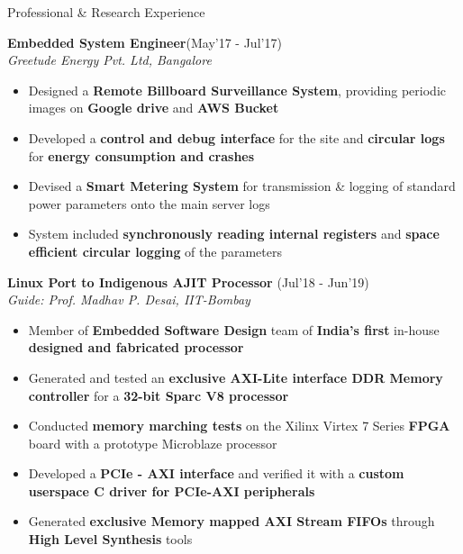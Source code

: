 \begin{rSection}{Professional \& Research Experience}

\vspace{-.4cm}
 
\item{\bf {\bf Embedded System Engineer}}\hfill{(May'17 - Jul'17)}\\ \emph{Greetude Energy Pvt. Ltd, Bangalore}\\
[-0.4cm]
  
\begin{itemize}[leftmargin=*]
    
	\itemsep \sepval
 
	\item Designed a {\bf Remote Billboard Surveillance System}, providing periodic images on {\bf Google drive} and {\bf AWS Bucket}
	 
	\item Developed a {\bf control and debug interface} for the site and {\bf circular logs} for {\bf energy consumption and crashes}

	\item Devised a {\bf Smart Metering System} for transmission \& logging of standard power parameters onto the main server logs
 
	\item System included {\bf synchronously reading internal registers} and {\bf space efficient circular logging} of the parameters
	      
 
\end{itemize}

\vspace{-0.1cm}
\item {\bf{Linux Port to Indigenous AJIT Processor}} \hfill {(Jul'18 - Jun'19)}\\

\emph{Guide: Prof. Madhav P. Desai, IIT-Bombay}\\
[-0.6cm]

\begin{itemize}[leftmargin=*]
		
	\itemsep \sepval

	\item Member of {\bf Embedded Software Design} team of {\bf India's first} in-house {\bf designed and fabricated processor}
	
	\item Generated and tested an {\bf exclusive AXI-Lite interface DDR
		Memory controller} for a {\bf 32-bit Sparc V8 processor}
	      
	\item Conducted {\bf memory marching tests} on the Xilinx Virtex 7 Series {\bf FPGA} board with a prototype Microblaze processor
	
	\item Developed a {\bf PCIe - AXI interface} and verified it with a {\bf
		custom userspace C driver for PCIe-AXI peripherals}

	\item Generated {\bf exclusive Memory mapped AXI Stream FIFOs} through {\bf High Level Synthesis} tools

\end{itemize}

\end{rSection}

